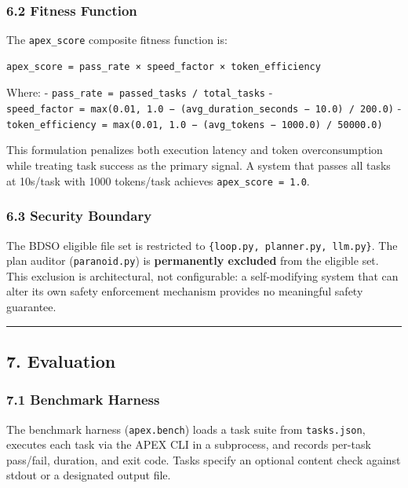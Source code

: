 \subsubsection{6.2 Fitness Function}\label{fitness-function}

The \texttt{apex\_score} composite fitness function is:

\begin{verbatim}
apex_score = pass_rate × speed_factor × token_efficiency
\end{verbatim}

Where: - \texttt{pass\_rate\ =\ passed\_tasks\ /\ total\_tasks} -
\texttt{speed\_factor\ =\ max(0.01,\ 1.0\ −\ (avg\_duration\_seconds\ −\ 10.0)\ /\ 200.0)}
-
\texttt{token\_efficiency\ =\ max(0.01,\ 1.0\ −\ (avg\_tokens\ −\ 1000.0)\ /\ 50000.0)}

This formulation penalizes both execution latency and token
overconsumption while treating task success as the primary signal. A
system that passes all tasks at 10s/task with 1000 tokens/task achieves
\texttt{apex\_score\ =\ 1.0}.

\subsubsection{6.3 Security Boundary}\label{security-boundary}

The BDSO eligible file set is restricted to
\texttt{\{loop.py,\ planner.py,\ llm.py\}}. The plan auditor
(\texttt{paranoid.py}) is \textbf{permanently excluded} from the
eligible set. This exclusion is architectural, not configurable: a
self-modifying system that can alter its own safety enforcement
mechanism provides no meaningful safety guarantee.

\begin{center}\rule{0.5\linewidth}{0.5pt}\end{center}

\subsection{7. Evaluation}\label{evaluation}

\subsubsection{7.1 Benchmark Harness}\label{benchmark-harness}

The benchmark harness (\texttt{apex.bench}) loads a task suite from
\texttt{tasks.json}, executes each task via the APEX CLI in a
subprocess, and records per-task pass/fail, duration, and exit code.
Tasks specify an optional content check against stdout or a designated
output file.

